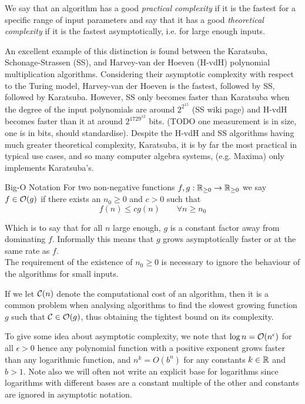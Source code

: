 We say that an algorithm has a good \textit{practical complexity} if it is the fastest for a specific range of input parameters and say that it has a good \textit{theoretical complexity} if it is the fastest asymptotically, i.e. for large enough inputs.

An excellent example of this distinction is found between the Karatsuba, Schonage-Strassen (SS), and Harvey-van der Hoeven (H-vdH) polynomial multiplication algorithms. Considering their asymptotic complexity with respect to the Turing model, Harvey-van der Hoeven is the fastest, followed by SS, followed by Karatsuba. However, SS only becomes faster than Karatsuba when the degree of the input polynomials are around $2^{2^{15}}$ (SS wiki page) and H-vdH becomes faster than it at around $2^{1729^{12}}$ bits. (TODO one measurement is in size, one is in bits, should standardise). Despite the H-vdH and SS algorithms having much greater theoretical complexity, Karatsuba, it is by far the most practical in typical use cases, and so many computer algebra systems, (e.g. Maxima) only implements Karatsuba's.

\begin{definition}{Big-O Notation}
    For two non-negative functions $f, g: {\mathbb R}_{\ge 0} \to {\mathbb R}_{\ge 0}$ we say $f \in \mathcal O(g)$ if there exists an $n_0 \ge 0$ and $c > 0$ such that 
    \begin{equation}\label{eq:big-o}
        f(n) \le cg(n) \qquad \forall n \ge n_0
    \end{equation}
\end{definition}
Which is to say that for all $n$ large enough, $g$ is a constant factor away from dominating $f$. Informally this means that $g$ grows asymptotically faster or at the same rate as $f$.\\
The requirement of the existence of $n_0 \ge 0$ is necessary to ignore the behaviour of the algorithms for small inputs.

If we let $\mathcal C(n)$ denote the computational cost of an algorithm, then it is a common problem when analysing algorithms to find the slowest growing function $g$ such that $\mathcal C \in \mathcal O(g)$, thus obtaining the tightest bound on its complexity.

To give some idea about asymptotic complexity, we note that $\log n = \mathcal O(n^\epsilon)$ for all $\epsilon > 0$ hence any polynomial function with a positive exponent grows faster than any logarithmic function, and $n^k = O(b^n)$ for any constants $k \in {\mathbb R}$ and $b > 1$. Note also we will often not write an explicit base for logarithms since logarithms with different bases are a constant multiple of the other and constants are ignored in asymptotic notation. 

